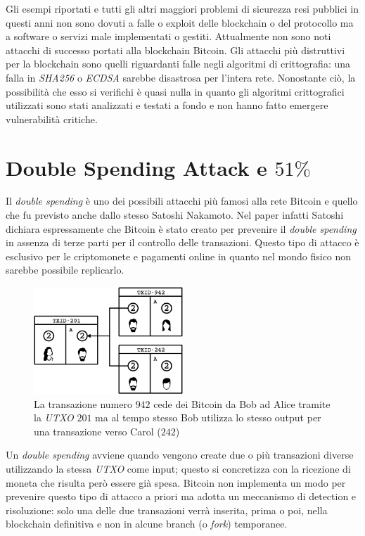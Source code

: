 Gli esempi riportati e tutti gli altri maggiori problemi di sicurezza resi pubblici in questi anni non sono dovuti a falle o exploit delle blockchain o del protocollo ma a software o servizi male implementati o gestiti. Attualmente non sono noti attacchi di successo portati alla blockchain Bitcoin.\newline
Gli attacchi più distruttivi per la blockchain sono quelli riguardanti falle negli algoritmi di crittografia: una falla in \textit{SHA256} o \textit{ECDSA} sarebbe disastrosa per l'intera rete. Nonostante ciò, la possibilità che esso si verifichi è quasi nulla in quanto gli algoritmi crittografici utilizzati sono stati analizzati e testati a fondo e non hanno fatto emergere vulnerabilità critiche.

\section{Double Spending Attack e $51\%$}
Il \textit{double spending} è uno dei possibili attacchi più famosi alla rete Bitcoin e quello che fu previsto anche dallo stesso Satoshi Nakamoto. Nel paper infatti Satoshi dichiara espressamente che Bitcoin è stato creato per prevenire il \textit{double spending} in assenza di terze parti per il controllo delle transazioni.\newline
Questo tipo di attacco è esclusivo per le criptomonete e pagamenti online in quanto nel mondo fisico non sarebbe possibile replicarlo.
\begin{figure}
    \centering
    \includegraphics[width=0.5\textwidth]{images/double_spending.png}
    \caption{La transazione numero $942$ cede dei Bitcoin da Bob ad Alice tramite la \textit{UTXO} $201$ ma al tempo stesso Bob utilizza lo stesso output per una transazione verso Carol ($242$) \cite{owning}}
\end{figure}
Un \textit{double spending} avviene quando vengono create due o più transazioni diverse utilizzando la stessa \textit{UTXO} come input; questo si concretizza con la ricezione di moneta che risulta però essere già spesa. Bitcoin non implementa un modo per prevenire questo tipo di attacco a priori ma adotta un meccanismo di detection e risoluzione: solo una delle due transazioni verrà inserita, prima o poi, nella blockchain definitiva e non in alcune branch (o \textit{fork}) temporanee.\newline
